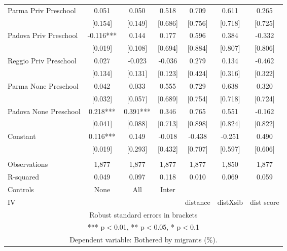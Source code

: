 \begin{tabular}{lcccccc}
Parma Priv Preschool & 0.051 & 0.050 & 0.518 & 0.709 & 0.611 & 0.265 \\
 & [0.154] & [0.149] & [0.686] & [0.756] & [0.718] & [0.725] \\
Padova Priv Preschool & -0.116*** & 0.144 & 0.177 & 0.596 & 0.384 & -0.332 \\
 & [0.019] & [0.108] & [0.694] & [0.884] & [0.807] & [0.806] \\
Reggio Priv Preschool & 0.027 & -0.023 & -0.036 & 0.279 & 0.134 & -0.462 \\
 & [0.134] & [0.131] & [0.123] & [0.424] & [0.316] & [0.322] \\
Parma None Preschool & 0.042 & 0.033 & 0.555 & 0.729 & 0.638 & 0.320 \\
 & [0.032] & [0.057] & [0.689] & [0.754] & [0.718] & [0.724] \\
Padova None Preschool & 0.218*** & 0.391*** & 0.346 & 0.765 & 0.551 & -0.162 \\
 & [0.041] & [0.088] & [0.713] & [0.898] & [0.824] & [0.822] \\
Constant & 0.116*** & 0.149 & -0.018 & -0.438 & -0.251 & 0.490 \\
 & [0.019] & [0.293] & [0.432] & [0.707] & [0.597] & [0.606] \\
 &  &  &  &  &  &  \\
Observations & 1,877 & 1,877 & 1,877 & 1,877 & 1,850 & 1,877 \\
R-squared & 0.049 & 0.097 & 0.118 & 0.010 & 0.069 & 0.059 \\
Controls & None & All & Inter &  &  &  \\
 IV &  &  &  & distance & distXsib & dist score \\ \hline
\multicolumn{7}{c}{ Robust standard errors in brackets} \\
\multicolumn{7}{c}{ *** p$<$0.01, ** p$<$0.05, * p$<$0.1} \\
\multicolumn{7}{c}{ Dependent variable: Bothered by migrants (\%).} \\
\end{tabular}
